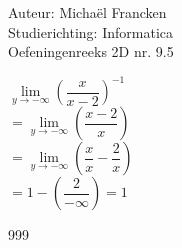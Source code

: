 \documentclass[a4paper]{article}
\begin{document}
\noindent \large Auteur: Michaël Francken \\
\noindent \large Studierichting: Informatica\\
\noindent \large Oefeningenreeks 2D nr. 9.5\\

\medskip

\normalsize

$\lim\limits_{y\rightarrow -\infty} \left(\dfrac{x}{x-2}\right)^{-1}$\\

$= \lim\limits_{y\rightarrow -\infty} \left(\dfrac{x-2}{x}\right)$\\

$= \lim\limits_{y\rightarrow -\infty} \left(\dfrac{x}{x}-\dfrac{2}{x}\right)$\\

$= 1-\left(\dfrac{2}{-\infty}\right) = 1$\\

\begin{thebibliography}{999}
\end{thebibliography}
\end{document}
